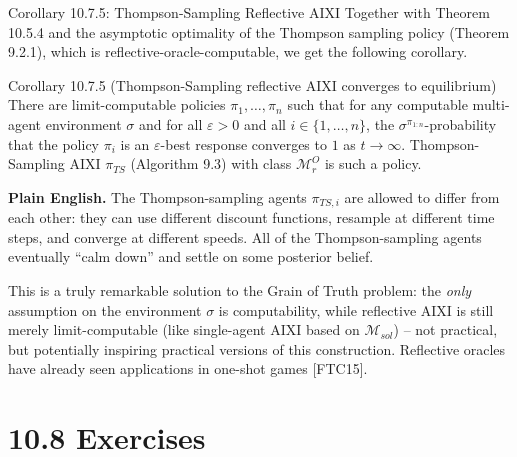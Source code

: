 \documentclass[aspectratio=169,10pt]{beamer}
\newcommand{\Mc}{\mathcal{M}}
\begin{document}
\begin{frame}{Corollary 10.7.5: Thompson-Sampling Reflective AIXI}
  Together with Theorem 10.5.4 and the asymptotic optimality of the
  Thompson sampling policy (Theorem 9.2.1), which is reflective-oracle-computable,
  we get the following corollary.
  \begin{block}{Corollary 10.7.5 (Thompson-Sampling reflective AIXI converges to equilibrium)}
    There are limit-computable policies $\pi_1,\ldots,\pi_n$ such that for
    any computable multi-agent environment $\sigma$ and for all
    $\varepsilon>0$ and all $i\in\{1,\ldots,n\}$, the
    $\sigma^{\pi_{1:n}}$-probability that the policy $\pi_i$ is an
    $\varepsilon$-best response converges to $1$ as $t\to\infty$.
    Thompson-Sampling AIXI $\pi_{TS}$ (Algorithm 9.3) with class $\Mc_r^O$
    is such a policy.
  \end{block}
  \textbf{Plain English.} The Thompson-sampling agents $\pi_{TS,i}$ are
  allowed to differ from each other: they can use different discount
  functions, resample at different time steps, and converge at different
  speeds. All of the Thompson-sampling agents eventually ``calm down'' and
  settle on some posterior belief.

  \vspace{0.3em}
  This is a truly remarkable solution to the Grain of Truth problem: the
  \emph{only} assumption on the environment $\sigma$ is computability,
  while reflective AIXI is still merely limit-computable (like single-agent
  AIXI based on $\Mc_{sol}$) -- not practical, but potentially inspiring
  practical versions of this construction. Reflective oracles have already
  seen applications in one-shot games {\footnotesize[FTC15]}.
\end{frame}

\section{10.8 Exercises}
\end{document}
